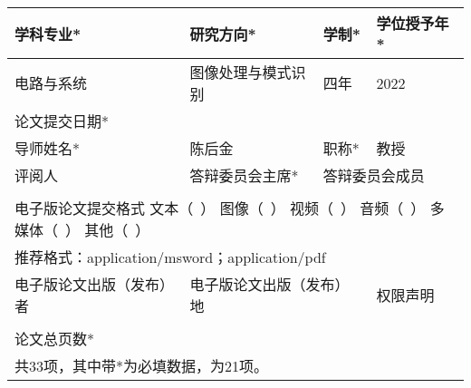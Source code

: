 \begin{table}[!ht]
\begin{adjustwidth}{-.4in}{-.4in}
\begin{tabular}{|p{6.9em}llll|}
		\multicolumn{2}{|p{12.9em}|}{学科专业*} & \multicolumn{1}{p{7em}|}{研究方向*} & \multicolumn{1}{p{8em}|}{学制*} & \multicolumn{1}{p{6em}|}{学位授予年*} \\
		\hline
		
		\multicolumn{2}{|l|}{电路与系统} & \multicolumn{1}{p{7em}|}{图像处理与模式识别} & \multicolumn{1}{l|}{四年} & 2022 \\
		\hline
		
		\multicolumn{1}{|p{6.9em}|}{论文提交日期*} & \multicolumn{4}{r|}{} \\
		\hline
		
		\multicolumn{1}{|p{6.9em}|}{导师姓名*} & \multicolumn{2}{l|}{陈后金} & \multicolumn{1}{p{8em}|}{职称*} &  教授\\
		\hline
		
		\multicolumn{1}{|p{6.9em}|}{评阅人} & \multicolumn{2}{p{13em}|}{答辩委员会主席*} & \multicolumn{2}{p{14em}|}{答辩委员会成员} \\
		\hline
		
		\multicolumn{1}{|r|}{\multirow{2}[2]{*}{}} & \multicolumn{2}{r|}{\multirow{2}[2]{*}{}} & \multicolumn{2}{r|}{\multirow{2}[2]{*}{}} \\
		
		\multicolumn{1}{|r|}{} & \multicolumn{2}{r|}{} & \multicolumn{2}{r|}{} \\
		\hline
		
		\multicolumn{5}{|p{33.9em}|}{电子版论文提交格式  文本（~）  图像（~） 视频（~） 音频（~） 多媒体（~） 其他（~）} \\
		\multicolumn{5}{|p{33.9em}|}{推荐格式：application/msword；application/pdf} \\
		\hline
		
		\multicolumn{2}{|p{12.9em}|}{电子版论文出版（发布）者} & \multicolumn{2}{p{15em}|}{电子版论文出版（发布）地} & \multicolumn{1}{p{6em}|}{权限声明} \\
		\hline
		
		\multicolumn{2}{|r|}{} & \multicolumn{2}{r|}{} &  \\
		\hline
		
		\multicolumn{1}{|p{6.9em}|}{论文总页数*} & \multicolumn{4}{r|}{} \\
		\hline
		
		\multicolumn{5}{|p{33.9em}|}{共33项，其中带*为必填数据，为21项。} \\
		\hline
	\end{tabular}
	\end{adjustwidth}
	\label{tab:addlabel}
\end{table}